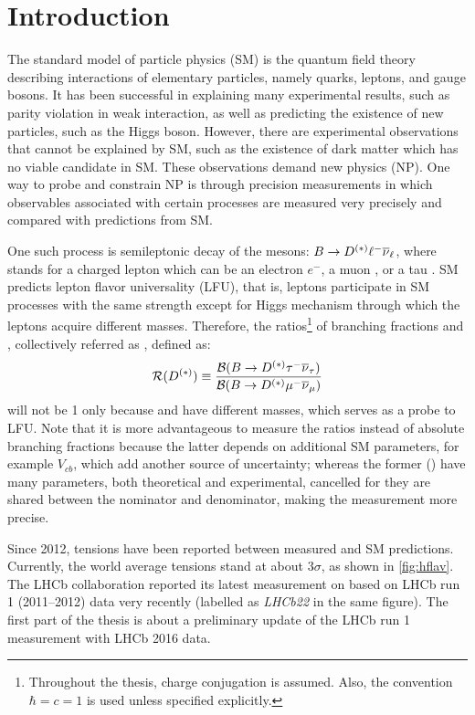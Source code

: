 \chapter{Introduction}
\label{ref:intro}

The standard model of particle physics (SM)
is the quantum field theory describing interactions of elementary particles,
namely quarks, leptons, and gauge bosons.
It has been successful in explaining many experimental results, such as parity
violation in weak interaction,
as well as predicting the existence of new particles, such as the Higgs boson.
However,
there are experimental observations that cannot be explained by SM,
such as the existence of dark matter
which has no viable candidate in SM.
These observations demand new physics (NP).
One way to probe and constrain NP is through precision measurements
in which observables associated with certain processes are measured very
precisely and compared with predictions from SM.

One such process is semileptonic decay of the \B mesons:
$B \rightarrow D^{(*)} {\ell^-} {{\overline{\nu}}_\ell}$,
where \ellm stands for a charged lepton which can be an electron $e^-$,
a muon \mun, or a tau \taum.
SM predicts lepton flavor universality (LFU),
that is, leptons participate in SM processes with the same strength
except for Higgs mechanism through which the leptons acquire different masses.
Therefore,
the ratios\footnote{
    Throughout the thesis, charge conjugation is assumed.
    Also, the convention $\hbar = c = 1$ is used unless specified explicitly.
} of branching fractions \RD and \RDst,
collectively referred as \RDX, defined as:
\begin{equation}
    \mathcal{R}(D^{(*)}) \equiv \frac{\mathcal{B}(B \rightarrow D^{(*)} {\tau^-} {{\overline{\nu}}_\tau})}{\mathcal{B}(B \rightarrow D^{(*)} {\mu^-} {{\overline{\nu}}_\mu})}
\end{equation}
will not be 1 only because \taum and \mun have different masses,
which serves as a probe to LFU.
Note that it is more advantageous to measure the ratios instead of absolute
branching fractions because the latter depends on additional SM parameters,
for example $V_{cb}$,
which add another source of uncertainty;
whereas the former (\RDX) have many parameters, both theoretical and
experimental, cancelled for they are shared between the nominator and
denominator, making the measurement more precise.

Since 2012, tensions have been reported between measured \RDX and SM
predictions.
Currently, the world average tensions stand at about $3 \sigma$,
as shown in \cref{fig:hflav}.
The LHCb collaboration reported its latest measurement on \RDX based on LHCb run
1 (2011--2012) data very recently
(labelled as \emph{LHCb22} in the same figure).
The first part of the thesis is about a preliminary update of the LHCb run 1
measurement with LHCb 2016 data.

